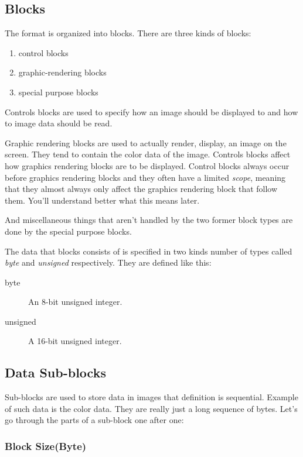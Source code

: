 \begin{refsection}
  \subsection{Blocks}

  The \gif format is organized into blocks. There are three kinds of
  blocks:

  \begin{enumerate}
  \item  control blocks
  \item graphic-rendering blocks
  \item special purpose blocks
  \end{enumerate}

  Controls blocks are used to specify how an image should be
  displayed to and how to image data should be read.

  Graphic rendering blocks are used to actually render, display, an
  image on the screen. They tend to contain the color data of the
  image. Controls blocks affect how graphics rendering blocks are to
  be displayed. Control blocks always occur before graphics rendering
  blocks and they often have a limited \textit{scope}, meaning that
  they almost always only affect the graphics rendering block that
  follow them. You'll understand better what this means later.

  And miscellaneous things that aren't handled by the two former
  block types are done by the special purpose blocks.

  The data that blocks consists of is specified in two kinds number of
  types called \textit{byte} and \textit{unsigned} respectively. They
  are defined like this:

  \begin{description}
  \item[byte] An 8-bit unsigned integer.
  \item[unsigned] A 16-bit unsigned integer.
  \end{description}

  \subsection{Data Sub-blocks}

  Sub-blocks are used to store data in \gif images that definition is
  sequential. Example of such data is the color data. They are really
  just a long sequence of bytes. Let's go through the parts of a sub-block one after one:

  \subsubsection*{Block Size(Byte)}


\end{refsection}
